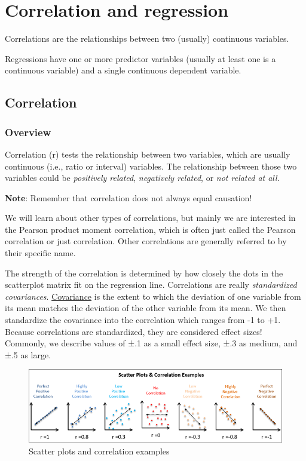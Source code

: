 \documentclass[
]{book}
\begin{document}
\hypertarget{correlation-and-regression}{%
\chapter{Correlation and regression}\label{correlation-and-regression}}

Correlations are the relationships between two (usually) continuous variables.

Regressions have one or more predictor variables (usually at least one is a continuous variable) and a single continuous dependent variable.

\hypertarget{correlation}{%
\section{Correlation}\label{correlation}}

\hypertarget{overview-10}{%
\subsection{Overview}\label{overview-10}}

Correlation (r) tests the relationship between two variables, which are usually continuous (i.e., ratio or interval) variables. The relationship between those two variables could be \emph{positively related}, \emph{negatively related}, or \emph{not related at all}.

\textbf{Note}: Remember that correlation does not always equal causation!

We will learn about other types of correlations, but mainly we are interested in the Pearson product moment correlation, which is often just called the Pearson correlation or just correlation. Other correlations are generally referred to by their specific name.

The strength of the correlation is determined by how closely the dots in the scatterplot matrix fit on the regression line. Correlations are really \emph{standardized covariances}. \underline{Covariance} is the extent to which the deviation of one variable from its mean matches the deviation of the other variable from its mean. We then standardize the covariance into the correlation which ranges from -1 to +1. Because correlations are standardized, they are considered effect sizes! Commonly, we describe values of ±.1 as a small effect size, ±.3 as medium, and ±.5 as large.

\begin{figure}

{\centering \includegraphics[width=1\linewidth]{images/08-correlation/correlation-examples} 

}

\caption{Scatter plots and correlation examples}\label{fig:unnamed-chunk-1}
\end{figure}
\end{document}
